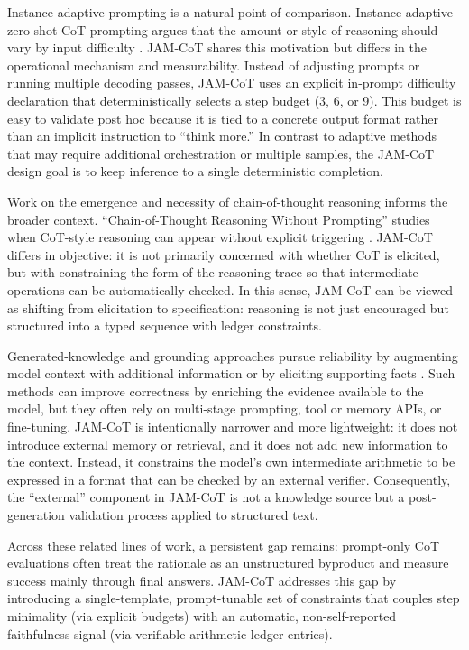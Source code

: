 \documentclass[journal,article,submit,pdftex,moreauthors]{Definitions/mdpi}
\begin{document}
Instance-adaptive prompting is a natural point of comparison. Instance-adaptive zero-shot CoT prompting argues that the amount or style of reasoning should vary by input difficulty \cite{gonzalez-2023-instance}. JAM-CoT shares this motivation but differs in the operational mechanism and measurability. Instead of adjusting prompts or running multiple decoding passes, JAM-CoT uses an explicit in-prompt difficulty declaration that deterministically selects a step budget (3, 6, or 9). This budget is easy to validate post hoc because it is tied to a concrete output format rather than an implicit instruction to “think more.” In contrast to adaptive methods that may require additional orchestration or multiple samples, the JAM-CoT design goal is to keep inference to a single deterministic completion.

Work on the emergence and necessity of chain-of-thought reasoning informs the broader context. “Chain-of-Thought Reasoning Without Prompting” studies when CoT-style reasoning can appear without explicit triggering \cite{mitra-2023-chain}. JAM-CoT differs in objective: it is not primarily concerned with whether CoT is elicited, but with constraining the form of the reasoning trace so that intermediate operations can be automatically checked. In this sense, JAM-CoT can be viewed as shifting from elicitation to specification: reasoning is not just encouraged but structured into a typed sequence with ledger constraints.

Generated-knowledge and grounding approaches pursue reliability by augmenting model context with additional information or by eliciting supporting facts \cite{modarressi-2023-generated}. Such methods can improve correctness by enriching the evidence available to the model, but they often rely on multi-stage prompting, tool or memory APIs, or fine-tuning. JAM-CoT is intentionally narrower and more lightweight: it does not introduce external memory or retrieval, and it does not add new information to the context. Instead, it constrains the model’s own intermediate arithmetic to be expressed in a format that can be checked by an external verifier. Consequently, the “external” component in JAM-CoT is not a knowledge source but a post-generation validation process applied to structured text.

Across these related lines of work, a persistent gap remains: prompt-only CoT evaluations often treat the rationale as an unstructured byproduct and measure success mainly through final answers. JAM-CoT addresses this gap by introducing a single-template, prompt-tunable set of constraints that couples step minimality (via explicit budgets) with an automatic, non-self-reported faithfulness signal (via verifiable arithmetic ledger entries).
\end{document}
